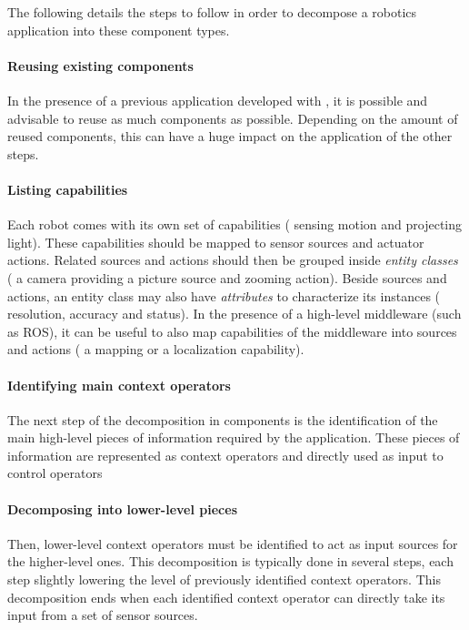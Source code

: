 The following details the steps to follow in order to decompose a
robotics application into these component types.

\paragraph*{Reusing existing components}
In the presence of a previous application developed with \diaspec{},
it is possible and advisable to reuse as much components as possible.
Depending on the amount of reused components, this can have a huge
impact on the application of the other steps.

\paragraph*{Listing capabilities}
Each robot comes with its own set of capabilities (\eg{} sensing
motion and projecting light). These capabilities should be mapped to
sensor sources and actuator actions. Related sources and actions
should then be grouped inside \emph{entity classes} (\eg{} a camera
providing a picture source and zooming action). Beside sources and
actions, an entity class may also have \emph{attributes} to
characterize its instances (\eg{} resolution, accuracy and status). In
the presence of a high-level middleware (such as ROS), it can be
useful to also map capabilities of the middleware into sources and
actions (\eg{} a mapping or a localization capability).

\paragraph*{Identifying main context operators}
The next step of the decomposition in components is the identification
of the main high-level pieces of information required by the
application. These pieces of information are represented as context
operators and directly used as input to control operators

\paragraph*{Decomposing into lower-level pieces}
Then, lower-level context operators must be identified to act as input
sources for the higher-level ones. This decomposition is typically
done in several steps, each step slightly lowering the level of
previously identified context operators. This decomposition ends when
each identified context operator can directly take its input from a
set of sensor sources. 

